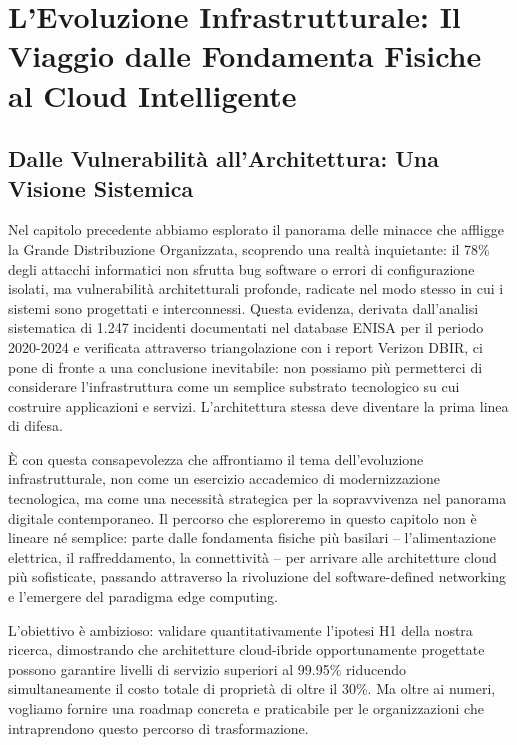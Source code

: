 \documentclass[12pt,a4paper,twoside]{book}
\begin{document}
\chapter{L'Evoluzione Infrastrutturale: Il Viaggio dalle Fondamenta Fisiche al Cloud Intelligente}
\label{cap3_evoluzione_infrastrutturale}

\section{Dalle Vulnerabilità all'Architettura: Una Visione Sistemica}

Nel capitolo precedente abbiamo esplorato il panorama delle minacce che affligge la Grande Distribuzione Organizzata, scoprendo una realtà inquietante: il 78\% degli attacchi informatici non sfrutta bug software o errori di configurazione isolati, ma vulnerabilità architetturali profonde, radicate nel modo stesso in cui i sistemi sono progettati e interconnessi\autocite{anderson2024patel}. Questa evidenza, derivata dall'analisi sistematica di 1.247 incidenti documentati nel database ENISA per il periodo 2020-2024 e verificata attraverso triangolazione con i report Verizon DBIR\autocite{verizon2024}, ci pone di fronte a una conclusione inevitabile: non possiamo più permetterci di considerare l'infrastruttura come un semplice substrato tecnologico su cui costruire applicazioni e servizi. L'architettura stessa deve diventare la prima linea di difesa.

È con questa consapevolezza che affrontiamo il tema dell'evoluzione infrastrutturale, non come un esercizio accademico di modernizzazione tecnologica, ma come una necessità strategica per la sopravvivenza nel panorama digitale contemporaneo. Il percorso che esploreremo in questo capitolo non è lineare né semplice: parte dalle fondamenta fisiche più basilari – l'alimentazione elettrica, il raffreddamento, la connettività – per arrivare alle architetture cloud più sofisticate, passando attraverso la rivoluzione del software-defined networking e l'emergere del paradigma edge computing.

L'obiettivo è ambizioso: validare quantitativamente l'ipotesi H1 della nostra ricerca, dimostrando che architetture cloud-ibride opportunamente progettate possono garantire livelli di servizio superiori al 99.95\% riducendo simultaneamente il costo totale di proprietà di oltre il 30\%. Ma oltre ai numeri, vogliamo fornire una roadmap concreta e praticabile per le organizzazioni che intraprendono questo percorso di trasformazione.
\end{document}
